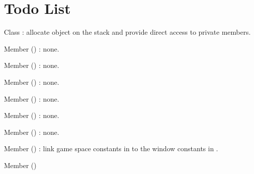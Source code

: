 \chapter{Todo List}
\hypertarget{todo}{}\label{todo}

\begin{DoxyRefList}
\item[Class \doxylink{classbocan_1_1snake_1_1_game}{bocan\+::snake\+::Game} ]\label{todo__todo000012}%
%
\+: allocate  object on the stack and provide direct access to  private members.  
\item[Member \doxylink{classbocan_1_1snake_1_1_game_a1d7263aefdb587ac30016489746b6041}{bocan\+::snake\+::Game\+::Collision\+Detect} ()]\label{todo__todo000011}%
%
\+: none.  
\item[Member \doxylink{classbocan_1_1snake_1_1_game_aacd8458913a341b6710b0bc80490b993}{bocan\+::snake\+::Game\+::End\+Game} ()]\label{todo__todo000005}%
%
\+: none.  
\item[Member \doxylink{classbocan_1_1snake_1_1_game_af37109aab7a6ec5c3f8af985e57e071d}{bocan\+::snake\+::Game\+::Food\+Collision} ()]\label{todo__todo000009}%
%
\+: none.  
\item[Member \doxylink{classbocan_1_1snake_1_1_game_ad59df6562a58a614fda24622d3715b65}{bocan\+::snake\+::Game\+::Game} ()]\label{todo__todo000001}%
%
\+: none.  
\item[Member \doxylink{classbocan_1_1snake_1_1_game_aaa0ff18388b32b4e6198835a35e000d3}{bocan\+::snake\+::Game\+::Game\+Loop} ()]\label{todo__todo000004}%
%
\+: none.  
\item[Member \doxylink{classbocan_1_1snake_1_1_game_af1966267ff79251a9ed5c73773267f8d}{bocan\+::snake\+::Game\+::Generate\+Food} ()]\label{todo__todo000007}%
%
\+: none.  
\item[Member \doxylink{classbocan_1_1snake_1_1_game_a85be9f66526c73f4e5247c91e6d40e24}{bocan\+::snake\+::Game\+::Generate\+Snake} ()]\label{todo__todo000006}%
%
\+: link game space constants in  to the window constants in .  
\item[Member \doxylink{classbocan_1_1snake_1_1_game_a29076c9ac787cccbdba8f498a2650bdd}{bocan\+::snake\+::Game\+::Increase\+Snake\+Size} ()]\label{todo__todo000010}%

\end{DoxyRefList}
